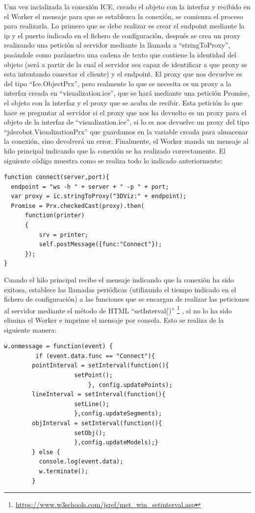 Una vez incializada la conexión ICE, creado el objeto con la interfaz y recibido en el Worker el mensaje para que se establezca la conexión, se comienza el proceso para realizarla. Lo primero que se debe realizar es crear el endpoint mediante la ip y el puerto indicado en el fichero de configuración, después se crea un proxy realizando una petición al servidor mediante la llamada a ``stringToProxy'', pasándole como parámetro una cadena de texto que contiene la identidad del objeto (será a partir de la cual el servidor sea capaz de identificar a que proxy se esta intentando conectar el cliente) y el endpoint. El proxy que nos devuelve es del tipo ``Ice.ObjectPrx'', pero realmente lo que se necesita es un proxy a la interfaz creada en ``visualization.ice'', que se hará mediante una petición Promise, el objeto con la interfaz y el proxy que se acaba de recibir. Esta petición lo que hace es preguntar al servidor si el proxy que nos ha devuelto es un proxy para el objeto de la interfaz de ``visualization.ice'', si lo es nos devuelve un proxy del tipo ``jderobot.VisualizationPrx'' que guardamos en la variable creada para almacenar la conexión, sino devolverá un error.  Finalmente, el Worker manda un mensaje al hilo principal indicando que la conexión se ha realizado correctamente. El siguiente código muestra como se realiza todo lo indicado anteriormente:

\begin{lstlisting}[frame=single]
function connect(server,port){
  endpoint = "ws -h " + server + " -p " + port;
  var proxy = ic.stringToProxy("3DViz:" + endpoint);
  Promise = Prx.checkedCast(proxy).then(
      function(printer)
      {
          srv = printer;
          self.postMessage({func:"Connect"});
      });
}
\end{lstlisting}

Cuando el hilo principal recibe el mensaje indicando que la conexión ha sido exitosa, establece las llamadas periódicas (utilizando el tiempo indicado en el fichero de configuración) a las funciones que se encargan de realizar las peticiones al servidor mediante el método de HTML ``setInterval()'' \footnote{\url{https://www.w3schools.com/jsref/met_win_setinterval.asp}} , si no lo ha sido elimina el Worker e imprime el mensaje por consola. Esto se realiza de la siguiente manera:

\begin{lstlisting}[frame=single]
w.onmessage = function(event) {
      	 if (event.data.func == "Connect"){
		pointInterval = setInterval(function(){
					setPoint();
						}, config.updatePoints);
		lineInterval = setInterval(function(){
					setLine();
					},config.updateSegments);
		objInterval = setInterval(function(){
					setObj();
					},config.updateModels);}	
        } else {
          console.log(event.data);
          w.terminate();
        }
\end{lstlisting}

